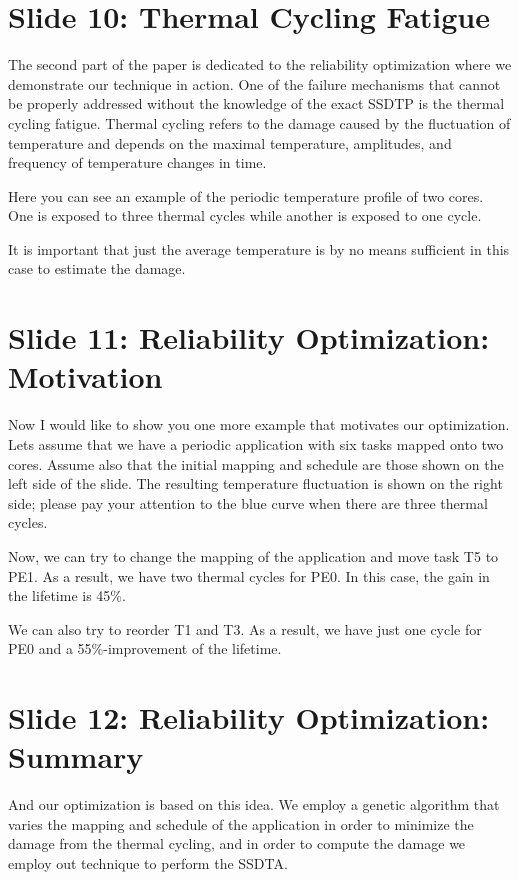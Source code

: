 \documentclass[11pt,a4paper]{article}
\begin{document}
\section{Slide 10: Thermal Cycling Fatigue}
The second part of the paper is dedicated to the reliability optimization where we demonstrate our technique in action. One of the failure mechanisms that cannot be properly addressed without the knowledge of the exact SSDTP is the thermal cycling fatigue. Thermal cycling refers to the damage caused by the fluctuation of temperature and depends on the maximal temperature, amplitudes, and frequency of temperature changes in time.

Here you can see an example of the periodic temperature profile of two cores. One is exposed to three thermal cycles while another is exposed to one cycle.

It is important that just the average temperature is by no means sufficient in this case to estimate the damage.

\section{Slide 11: Reliability Optimization: Motivation}
Now I would like to show you one more example that motivates our optimization. Lets assume that we have a periodic application with six tasks mapped onto two cores. Assume also that the initial mapping and schedule are those shown on the left side of the slide. The resulting temperature fluctuation is shown on the right side; please pay your attention to the blue curve when there are three thermal cycles.

Now, we can try to change the mapping of the application and move task T5 to PE1. As a result, we have two thermal cycles for PE0. In this case, the gain in the lifetime is 45\%.

We can also try to reorder T1 and T3. As a result, we have just one cycle for PE0 and a 55\%-improvement of the lifetime.

\section{Slide 12: Reliability Optimization: Summary}
And our optimization is based on this idea. We employ a genetic algorithm that varies the mapping and schedule of the application in order to minimize the damage from the thermal cycling, and in order to compute the damage we employ out technique to perform the SSDTA.
\end{document}
